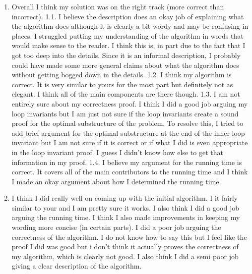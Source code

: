 \documentclass[11pt]{article}
\theoremstyle{nonumberplain}
\begin{document}
\begin{enumerate}
\item Overall I think my solution was on the right track (more correct than incorrect). 1.1. I believe the description does an okay job of explaining what the algorithm does although it is clearly a bit wordy and may be confusing in places. I struggled putting my understanding of the algorithm in words that would make sense to the reader. I think this is, in part due to the fact that I got too deep into the details. Since it is an informal description, I probably could have made some more general claims about what the algorithm does without getting bogged down in the details. 1.2. I think my algorithm is correct. It is very similar to yours for the most part but definitely not as elegant. I think all of the main components are there though. 1.3. I am not entirely sure about my correctness proof. I think I did a good job arguing my loop invariants but I am just not sure if the loop invariants create a sound proof for the optimal substructure of the problem. To resolve this, I tried to add brief argument for the optimal substructure at the end of the inner loop invariant but I am not sure if it is correct or if what I did is even appropriate in the loop invariant proof. I guess I didn't know how else to get that information in my proof. 1.4. I believe my argument for the running time is correct. It covers all of the main contributors to the running time and I think I made an okay argument about how I determined the running time. 
\item I think I did really well on coming up with the initial algorithm. I it fairly similar to your and I am pretty sure it works. I also think I did a good job arguing the running time. I think I also made improvements in keeping my wording more concise (in certain parts). I did a poor job arguing the correctness of the algorithm. I do not know how to say this but I feel like the proof I did was good but i don't think it actually proves the correctness of my algorithm, which is clearly not good. I also think I did a semi poor job giving a clear description of the algorithm.  

\end{enumerate}
\end{document}
